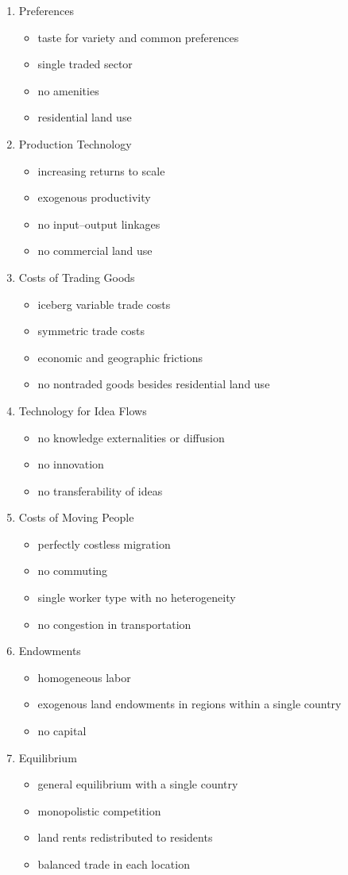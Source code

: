 \documentclass[11pt]{article}
\begin{document}
\begin{enumerate}
\item Preferences
\begin{itemize}
\item taste for variety and common preferences
\item single traded sector
\item no amenities
\item residential land use
\end{itemize}
\item Production Technology
\begin{itemize}
\item increasing returns to scale
\item exogenous productivity
\item no input–output linkages
\item no commercial land use
\end{itemize}
\item Costs of Trading Goods
\begin{itemize}
\item iceberg variable trade costs
\item symmetric trade costs
\item economic and geographic frictions
\item no nontraded goods besides residential land use
\end{itemize}
\item Technology for Idea Flows
\begin{itemize}
\item no knowledge externalities or diffusion
\item no innovation
\item no transferability of ideas
\end{itemize}
\item Costs of Moving People
\begin{itemize}
\item perfectly costless migration
\item no commuting
\item single worker type with no heterogeneity
\item no congestion in transportation
\end{itemize}
\item Endowments
\begin{itemize}
\item homogeneous labor
\item exogenous land endowments in regions within a single country
\item no capital
\end{itemize}
\item Equilibrium
\begin{itemize}
\item general equilibrium with a single country
\item monopolistic competition
\item land rents redistributed to residents
\item balanced trade in each location
\end{itemize}
\end{enumerate}
\end{document}
